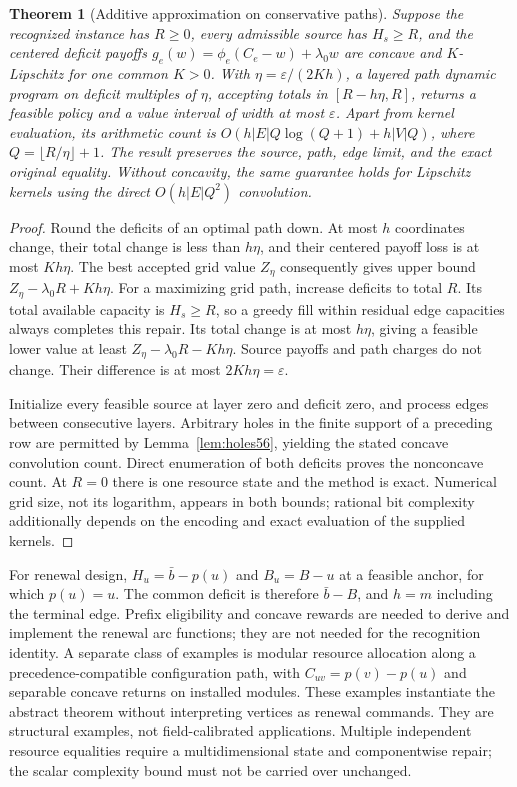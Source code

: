 \documentclass[11pt,letterpaper]{article}
\newtheorem{theorem}{Theorem}[section]
\theoremstyle{definition}\newtheorem{remark}[theorem]{Remark}
\begin{document}
\begin{theorem}[Additive approximation on conservative paths]\label{thm:abstractapprox59}
Suppose the recognized instance has $R\geq0$, every admissible source has $H_s\geq R$, and the centered deficit payoffs
$g_e(w)=\phi_e(C_e-w)+\lambda_0w$ are concave and $K$-Lipschitz for one common $K>0$. With $\eta=\varepsilon/(2Kh)$, a layered path dynamic program on deficit multiples of $\eta$, accepting totals in $[R-h\eta,R]$, returns a feasible policy and a value interval of width at most $\varepsilon$. Apart from kernel evaluation, its arithmetic count is
$O(h|E|Q\log(Q+1)+h|V|Q)$, where $Q=\lfloor R/\eta\rfloor+1$. The result preserves the source, path, edge limit, and the exact original equality. Without concavity, the same guarantee holds for Lipschitz kernels using the direct $O(h|E|Q^2)$ convolution.
\end{theorem}
\begin{proof}
Round the deficits of an optimal path down. At most $h$ coordinates change, their total change is less than $h\eta$, and their centered payoff loss is at most $Kh\eta$. The best accepted grid value $Z_\eta$ consequently gives upper bound $Z_\eta-\lambda_0R+Kh\eta$. For a maximizing grid path, increase deficits to total $R$. Its total available capacity is $H_s\geq R$, so a greedy fill within residual edge capacities always completes this repair. Its total change is at most $h\eta$, giving a feasible lower value at least $Z_\eta-\lambda_0R-Kh\eta$. Source payoffs and path charges do not change. Their difference is at most $2Kh\eta=\varepsilon$.

Initialize every feasible source at layer zero and deficit zero, and process edges between consecutive layers. Arbitrary holes in the finite support of a preceding row are permitted by Lemma~\ref{lem:holes56}, yielding the stated concave convolution count. Direct enumeration of both deficits proves the nonconcave count. At $R=0$ there is one resource state and the method is exact. Numerical grid size, not its logarithm, appears in both bounds; rational bit complexity additionally depends on the encoding and exact evaluation of the supplied kernels.
\end{proof}

For renewal design, $H_u=\bar b-p(u)$ and $B_u=B-u$ at a feasible anchor, for which $p(u)=u$. The common deficit is therefore $\bar b-B$, and $h=m$ including the terminal edge. Prefix eligibility and concave rewards are needed to derive and implement the renewal arc functions; they are not needed for the recognition identity. A separate class of examples is modular resource allocation along a precedence-compatible configuration path, with $C_{uv}=p(v)-p(u)$ and separable concave returns on installed modules. These examples instantiate the abstract theorem without interpreting vertices as renewal commands. They are structural examples, not field-calibrated applications. Multiple independent resource equalities require a multidimensional state and componentwise repair; the scalar complexity bound must not be carried over unchanged.
\end{document}
